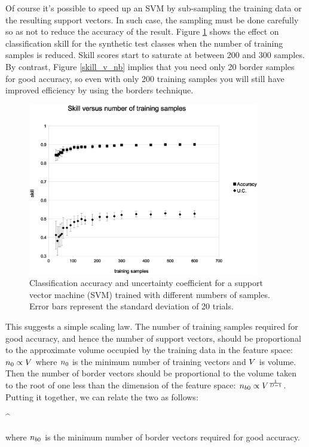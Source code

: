 Of course it's possible to speed up an SVM by sub-sampling the training data
or the resulting support vectors.
In such case, the sampling must be done carefully so as not to reduce the
accuracy of the result.
Figure \ref{skill_v_nt} shows the effect on classification skill for the
synthetic test classes when the number of training samples is reduced.
Skill scores start to saturate at between 200 and 300 samples.
By contrast, Figure \ref{skill_v_nb} implies that you need only 20 border samples
for good accuracy, so even with only 200 training samples you will still
have improved efficiency by using the borders technique.

\begin{figure}
\includegraphics[width=0.9\textwidth]{../skill_v_nt}
\caption{Classification accuracy and uncertainty coefficient for a support vector machine (SVM) trained with different numbers of samples.
Error bars represent the standard deviation of 20 trials.}
\label{skill_v_nt}
\end{figure}

This suggests a simple scaling law. The number of training samples required
for good accuracy, and hence the number of support vectors, 
should be proportional to the approximate volume occupied by the
training data in the feature space: $n_0 \propto V$ where 
$n_0$ is the minimum number of training vectors and $V$ is volume.
Then the number of border vectors should be proportional to the volume
taken to the root of one less than the dimension of the feature space:
$n_{b0} \propto V^\frac{1}{D-1}$.
Putting it together, we can relate the two as follows:
\begin{eqnnon}
	\minborders \propto \mintrain^
	\label{scaling_law}
\end{eqnnon}
where $n_{b0}$ is the minimum number of border vectors required for good
accuracy.


